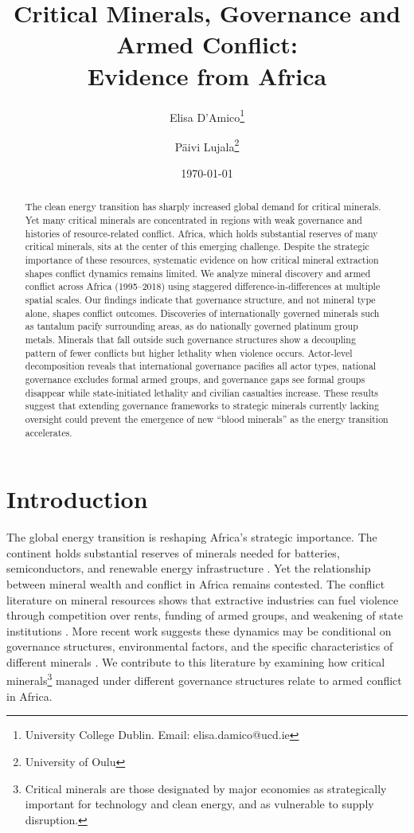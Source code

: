 \documentclass[11pt]{article}
\title{Critical Minerals, Governance and Armed Conflict: \\ Evidence from Africa}
\author{Elisa D'Amico\thanks{University College Dublin. Email: elisa.damico@ucd.ie} \and P\"aivi Lujala\thanks{University of Oulu}}
\date{\today}
\begin{document}
\maketitle

\begin{abstract}
\noindent The clean energy transition has sharply increased global demand for critical minerals. Yet many critical minerals are concentrated in regions with weak governance and histories of resource-related conflict. Africa, which holds substantial reserves of many critical minerals, sits at the center of this emerging challenge. Despite the strategic importance of these resources, systematic evidence on how critical mineral extraction shapes conflict dynamics remains limited. We analyze mineral discovery and armed conflict across Africa (1995--2018) using staggered difference-in-differences at multiple spatial scales. Our findings indicate that governance structure, and not mineral type alone, shapes conflict outcomes. Discoveries of internationally governed minerals such as tantalum pacify surrounding areas, as do nationally governed platinum group metals. Minerals that fall outside such governance structures show a decoupling pattern of fewer conflicts but higher lethality when violence occurs. Actor-level decomposition reveals that international governance pacifies all actor types, national governance excludes formal armed groups, and governance gaps see formal groups disappear while state-initiated lethality and civilian casualties increase. These results suggest that extending governance frameworks to strategic minerals currently lacking oversight could prevent the emergence of new ``blood minerals'' as the energy transition accelerates.
\end{abstract}

\section{Introduction}

The global energy transition is reshaping Africa's strategic importance. The continent holds substantial reserves of minerals needed for batteries, semiconductors, and renewable energy infrastructure \citep{iea2021critical}. Yet the relationship between mineral wealth and conflict in Africa remains contested. The conflict literature on mineral resources shows that extractive industries can fuel violence through competition over rents, funding of armed groups, and weakening of state institutions \citep{ross2004does, collier2004greed, lujala2009deadly, lujala2010spoils, fearon2005primary}. More recent work suggests these dynamics may be conditional on governance structures, environmental factors, and the specific characteristics of different minerals \citep{bazzi2019promises, berman2017mine, sanchez2020mining, buhaug2015climate, vonuexkull2016civil, koubi2019climate}. We contribute to this literature by examining how critical minerals\footnote{Critical minerals are those designated by major economies as strategically important for technology and clean energy, and as vulnerable to supply disruption.} managed under different governance structures relate to armed conflict in Africa.
\end{document}
